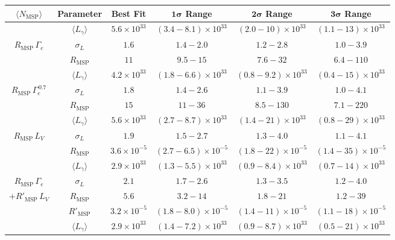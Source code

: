 \documentclass[a4paper,11pt]{article}
\begin{document}
\begin{table}[t]
\centering
\normalsize
\vspace{12pt}
{\renewcommand{\arraystretch}{1.2}
\begin{tabular}{|c|c|cccc|}
    \hline $\langle N_\textrm{MSP}\rangle$ & Parameter & Best Fit & $\bm{1 \sigma}$ Range & $\bm{2 \sigma}$ Range & $\bm{3 \sigma}$ Range\\
    \hline\hline
      & $\langle L_{\gamma} \rangle$ & $5.6 \times 10^{33}$& $(3.4 - 8.1) \times 10^{33}$& $(2.0 - 10) \times 10^{33}$& $(1.1 - 13) \times 10^{33}$\\
      $R_\textrm{MSP} \, \Gamma_e$ & $\sigma_L$ & $1.6$& $1.4 - 2.0$& $1.2 - 2.8$& $1.0 - 3.9$ \\
    & $R_\textrm{MSP}$ & $11$& $9.5 - 15$& $7.6 - 32$& $6.4 - 110$ \\
    \hline
         & $\langle L_{\gamma} \rangle$ & $4.2 \times 10^{33}$& $(1.8 - 6.6) \times 10^{33}$& $(0.8 - 9.2) \times 10^{33}$& $(0.4 - 15) \times 10^{33}$\\
     $R_\textrm{MSP} \, \Gamma_e^{\,0.7}$ & $\sigma_L$ & $1.8$& $1.4 - 2.6$& $1.1 - 3.9$& $1.0 - 4.1$ \\
    & $R_\textrm{MSP}$ & $15$& $11 - 36$& $8.5 - 130$& $7.1 - 220$ \\
    \hline
         & $\langle L_{\gamma} \rangle$ & $5.6 \times 10^{33}$& $(2.7-8.7) \times 10^{33}$& $(1.4 - 21) \times 10^{33}$& $(0.8 - 29) \times 10^{33}$\\
     $R_\textrm{MSP} \, L_V$ & $\sigma_L$ & $1.9$& $1.5 - 2.7$& $1.3 - 4.0$& $1.1 - 4.1$ \\
    & $R_\textrm{MSP}$ & $3.6\times 10^{-5}$& $(2.7-6.5)\times 10^{-5}$& $(1.8-22)\times 10^{-5}$& $(1.4-35)\times 10^{-5}$ \\
    \hline    
         & $\langle L_{\gamma} \rangle$ & $2.9 \times 10^{33}$& $(1.3 - 5.5) \times 10^{33}$& $(0.9 - 8.4) \times 10^{33}$& $(0.7 - 14) \times 10^{33}$\\
     $R_\textrm{MSP} \, \Gamma_e$ & $\sigma_L$ & $2.1$& $1.7 - 2.6$& $1.3 - 3.5$& $1.2 - 4.0$ \\
    $+R'_\textrm{MSP}\,L_V$& $R_\textrm{MSP}$ & $5.6$& $3.2 - 14$& $1.8 - 21$& $1.2 - 39$ \\
    & $R'_\textrm{MSP}$ & $3.2\times 10^{-5}$& $(1.8-8.0)\times 10^{-5}$& $(1.4-11)\times 10^{-5}$& $(1.1-18)\times 10^{-5}$ \\
    \hline   
         & $\langle L_{\gamma} \rangle$ & $2.9 \times 10^{33}$& $(1.4 - 7.2) \times 10^{33}$& $(0.9 - 8.7) \times 10^{33}$& $(0.5 - 21) \times 10^{33}$\\

\end{tabular}}
\end{table}
\end{document}
